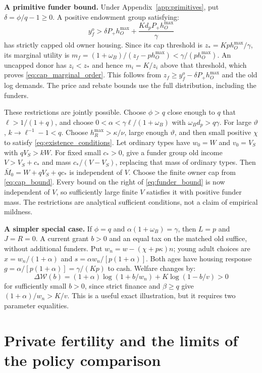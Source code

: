 \documentclass[11pt]{article}
\begin{document}
\textbf{A primitive funder bound.} Under Appendix~\ref{app:primitives}, put
$\delta=\phi/q-1\ge0$. A positive endowment group satisfying:
\begin{equation}
y_f^o>\delta P_+h_O^{\max}+\frac{Kd_pP_+h_O^{\max}}\gamma
\label{eq:funder_bound}
\end{equation}
has strictly capped old owner housing. Since its cap threshold is
$z_*=Kph_O^{\max}/\gamma$, its marginal utility is
$m_f=(1+\omega_B)/(z_f-ph_O^{\max})<\gamma/(ph_O^{\max})$.
An uncapped donor has $z_i<z_*$ and hence $m_i=K/z_i$ above that threshold,
which proves \eqref{eq:cap_marginal_order}. This follows from
$z_f\ge y_f^o-\delta P_+h_O^{\max}$ and the old log demands. The
price and rebate bounds use the full distribution, including the funders.

These restrictions are jointly possible. Choose $\phi>q$ close enough to
$q$ that $\ell>1/(1+q)$, and choose
$0<\alpha<\gamma\ell/(1+\omega_B)$ with
$\omega_Bd_p>q\gamma$. For large $\vartheta$,
$k\to\ell^{-1}-1<q$. Choose $h_R^{\max}>\kappa/\nu$, large enough
$\vartheta$, and then small positive $\chi$ to satisfy
\eqref{eq:existence_conditions}. Let ordinary types have $w_0=W$ and
$v_0=V_S$ with $qV_S>kW$. For fixed small $c_*>0$, give a funder group
old income $V>V_S+c_*$ and mass $c_* /(V-V_S)$, replacing that mass of
ordinary types. Then $\bar M_0=W+qV_S+qc_*$ is independent of $V$.
Choose the finite owner cap from \eqref{eq:cap_bound}. Every bound on the
right of \eqref{eq:funder_bound} is now independent of $V$, so sufficiently
large finite $V$ satisfies it with positive funder mass. The restrictions
are analytical sufficient conditions, not a claim of empirical mildness.

\textbf{A simpler special case.} If $\phi=q$ and
$\alpha(1+\omega_B)=\gamma$, then $L=p$ and $J=R=0$.
A current grant $b>0$ and an equal tax on the matched old suffice, without
additional funders. Put $w_n=w-(\chi+p\kappa)n$; young adult choices are
$x=w_n/(1+\alpha)$ and $s=\alpha w_n/[p(1+\alpha)]$. Both ages have
housing response $g=\alpha/[p(1+\alpha)]=\gamma/(Kp)$ to cash. Welfare
changes by:
\begin{equation}
\Delta\mathcal W(b)=(1+\alpha)\log(1+b/w_n)+K\log(1-b/v)>0
\end{equation}
for sufficiently small $b>0$, since strict finance and $\beta\ge q$ give
$(1+\alpha)/w_n>K/v$. This is a useful exact illustration, but it requires
two parameter equalities.

\section{Private fertility and the limits of the policy comparison}
\label{app:fertility}
\end{document}
